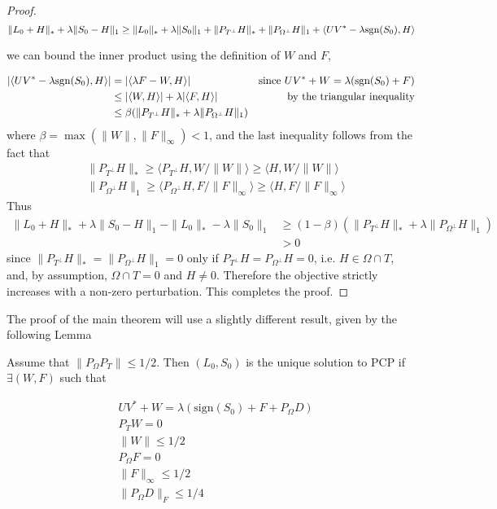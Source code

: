 \begin{proof}
\[
\|L_0 + H\|_* + \lambda \|S_0 - H\|_1 \geq \|L_0\|_* + \lambda \|S_0\|_1  + \|P_{T^\perp} H\|_* + \|P_{\Omega^\perp} H\|_1 + \langle UV^* - \lambda  \text{sgn}(S_0), H\rangle
\]

we can bound the inner product using the definition of $W$ and $F$,

\begin{align*}
|\langle UV^* - \lambda  \text{sgn}(S_0), H\rangle|
& = |\langle \lambda F - W, H\rangle|  & \text{since } UV^* + W = \lambda(\text{sgn}(S_0) + F) \\
&\leq |\langle W, H \rangle| + \lambda |\langle F, H \rangle| & \text{by the triangular inequality} \\
&\leq \beta (\|P_{T^\perp} H\|_* + \lambda \|P_{\Omega^\perp} H\|_1)
\end{align*}
where $\beta = \max (\|W\|, \|F\|_\infty) < 1$, and the last inequality follows from the fact that
\[
\begin{aligned}
& \|P_{T^\perp} H\|_* \geq \langle P_{T^\perp} H, W/\|W\| \rangle \geq \langle H, W/\|W\| \rangle\\
& \|P_{\Omega^\perp} H\|_1 \geq \langle P_{\Omega^\perp} H, F/\|F\|_\infty \rangle \geq \langle H, F/\|F\|_\infty \rangle
\end{aligned}
\]
Thus
\begin{align*}
\|L_0 + H\|_* + \lambda \|S_0 - H\|_1 - \|L_0\|_* - \lambda \|S_0 \|_1
&\geq  (1-\beta) \left( \|P_{T^\perp} H\|_* + \lambda \|P_{\Omega^\perp} H\|_1 \right) \\
& > 0
\end{align*}
since $\|P_{T^\perp} H\|_* = \|P_{\Omega^\perp} H\|_1 = 0$ only if $P_{T^\perp} H = P_{\Omega^\perp} H = 0$, i.e. $H \in \Omega \cap T$, and, by assumption, $\Omega \cap T = {0}$ and $H \neq 0$. Therefore the objective strictly increases with a non-zero perturbation. This completes the proof.

\end{proof}


The proof of the main theorem will use a slightly different result, given by the following Lemma
\begin{lemma}
\label{lem:dual_cert}
Assume that $\|P_\Omega P_T \| \leq 1/2$. Then $(L_0,S_0)$ is the unique solution to PCP if $\exists (W, F)$ such that

\begin{equation}
\label{eq:dual_cert_cond}
\begin{aligned}
& UV^* + W = \lambda(\text{sign}(S_0) + F + P_\Omega D) \\
& P_T W = 0 \\
& \|W\| \leq 1/2 \\
& P_\Omega F = 0 \\
& \|F\|_\infty \leq 1/2 \\
&\|P_\Omega D \|_F \leq 1/4
\end{aligned}
\end{equation}

\end{lemma}

